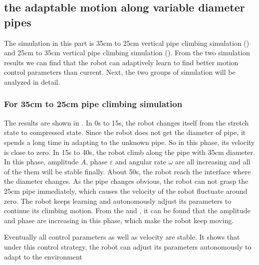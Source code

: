 \subsection{the adaptable motion along variable diameter pipes}

The simulation in this part is 35cm to 25cm vertical pipe climbing simulation () and 25cm to 35cm vertical pipe climbing simulation (). From the two simulation results we can find that the robot can adaptively learn to find better motion control parameters than current. Next, the two groups of simulation will be analyzed in detail.

\subsubsection{For 35cm to 25cm pipe climbing simulation}

The results are shown in . In 0s to 15s, the robot changes itself from the stretch state to compressed state. Since the robot does not get the diameter of pipe, it spends a long time in adapting to the unknown pipe. So in this phase, its velocity is close to zero. In 15s to 40s, the robot climb along the pipe with 35cm diameter. In this phase, amplitude $A$, phase $\varepsilon$ and angular rate $\omega$ are all increasing and all of the them will be stable finally. About 50s, the robot reach the interface where the diameter changes. As the pipe changes obvious, the robot can not grasp the 25cm pipe immediately, which causes the velocity of the robot fluctuate around zero. The robot keeps learning and autonomously adjust its parameters to continue its climbing motion. From the  and , it can be found that the amplitude and phase are increasing in this phase, which make the robot keep moving.

Eventually all control parameters as well as velocity are stable. It shows that under this control strategy, the robot can adjust its parameters autonomously to adapt to the environment

